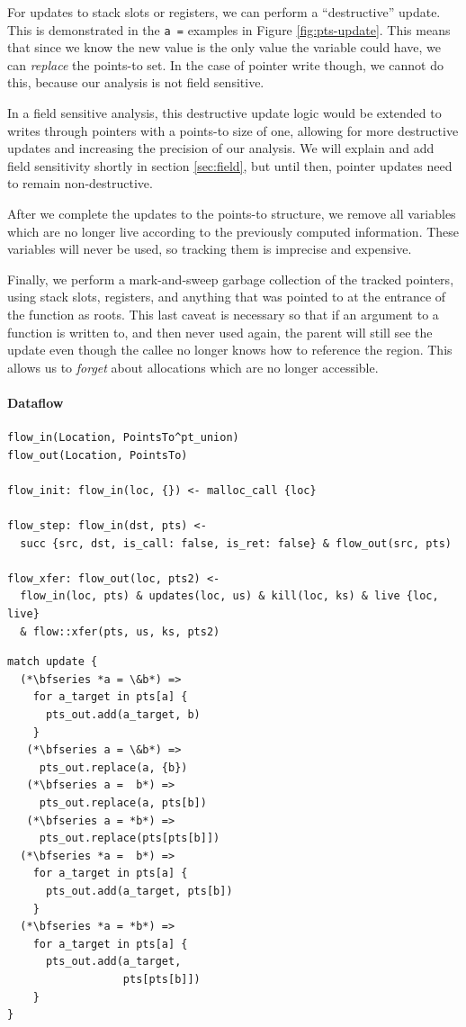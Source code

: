 For updates to stack slots or registers, we can perform a ``destructive'' update.
This is demonstrated in the \texttt{a =} examples in Figure \ref{fig:pts-update}.
This means that since we know the new value
is the only value the variable could have, we can \emph{replace} the
points-to set.  In the case of pointer write though, we cannot do
this, because our analysis is not field sensitive.

In a field sensitive analysis, this destructive update logic would be
extended to writes through pointers with a points-to size of one,
allowing for more destructive updates and increasing the precision of
our analysis.
We will explain and add field sensitivity shortly in section \ref{sec:field}, but until then, pointer updates need to remain non-destructive.

After we complete the updates to the points-to structure, we remove
all variables which are no longer live according to the previously computed information.
These variables will never be used, so tracking them is imprecise and expensive.

Finally, we perform a mark-and-sweep garbage collection of the tracked pointers, using stack slots, registers, and anything that was pointed to at the entrance of the function as roots.
This last caveat is necessary so that if an argument to a function is written to, and then never used again, the parent will still see the update even though the callee no longer knows how to reference the region.
This allows us to \emph{forget} about allocations which are no longer accessible.

\paragraph{Dataflow}
\begin{lstlisting}[float=*t, caption={Flow Sensitive Pointer Analysis Rules}, label=lst:flowrules]
flow_in(Location, PointsTo^pt_union)
flow_out(Location, PointsTo)

flow_init: flow_in(loc, {}) <- malloc_call {loc}

flow_step: flow_in(dst, pts) <-
  succ {src, dst, is_call: false, is_ret: false} & flow_out(src, pts)

flow_xfer: flow_out(loc, pts2) <-
  flow_in(loc, pts) & updates(loc, us) & kill(loc, ks) & live {loc, live}
  & flow::xfer(pts, us, ks, pts2)
\end{lstlisting}
\begin{lstlisting}[float=t, caption={Process Update}, label=lst:process]
match update {
  (*\bfseries *a = \&b*) =>
    for a_target in pts[a] {
      pts_out.add(a_target, b)
    }
   (*\bfseries a = \&b*) =>
     pts_out.replace(a, {b})
   (*\bfseries a =  b*) =>
     pts_out.replace(a, pts[b])
   (*\bfseries a = *b*) =>
     pts_out.replace(pts[pts[b]])
  (*\bfseries *a =  b*) =>
    for a_target in pts[a] {
      pts_out.add(a_target, pts[b])
    }
  (*\bfseries *a = *b*) =>
    for a_target in pts[a] {
      pts_out.add(a_target,
                  pts[pts[b]])
    }
}
\end{lstlisting}

